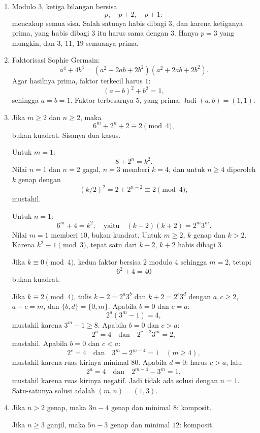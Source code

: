 \documentclass[12pt]{scrartcl}
\begin{document}
\begin{enumerate}[resume]
	\item Modulo $3$, ketiga bilangan bersisa
	\[ p, \quad p + 2, \quad p + 1: \]
	mencakup semua sisa. Salah satunya habis dibagi $3$,
	dan karena ketiganya prima, yang habis dibagi $3$ itu harus sama dengan $3$.
	Hanya $p = 3$ yang mungkin, dan $3$, $11$, $19$ semuanya prima.

	\item Faktorisasi Sophie Germain:
	\[ a^4 + 4b^4 = (a^2 - 2ab + 2b^2)(a^2 + 2ab + 2b^2). \]
	Agar hasilnya prima, faktor terkecil harus $1$:
	\[ (a-b)^2 + b^2 = 1, \]
	sehingga $a = b = 1$.
	Faktor terbesarnya $5$, yang prima. Jadi $(a, b) = (1, 1)$.

	\item Jika $m \ge 2$ dan $n \ge 2$, maka
	\[ 6^m + 2^n + 2 \equiv 2 \pmod{4}, \]
	bukan kuadrat. Sisanya dua kasus.

	Untuk $m = 1$:
	\[ 8 + 2^n = k^2. \]
	Nilai $n = 1$ dan $n = 2$ gagal, $n = 3$ memberi $k = 4$,
	dan untuk $n \ge 4$ diperoleh $k$ genap dengan
	\[ (k/2)^2 = 2 + 2^{n-2} \equiv 2 \pmod{4}, \]
	mustahil.

	Untuk $n = 1$:
	\[ 6^m + 4 = k^2, \quad \text{yaitu} \quad (k-2)(k+2) = 2^m 3^m. \]
	Nilai $m = 1$ memberi $10$, bukan kuadrat.
	Untuk $m \ge 2$, $k$ genap dan $k > 2$.
	Karena $k^2 \equiv 1 \pmod{3}$, tepat satu dari $k-2$, $k+2$ habis dibagi $3$.

	Jika $k \equiv 0 \pmod{4}$, kedua faktor bersisa $2$ modulo $4$
	sehingga $m = 2$, tetapi
	\[ 6^2 + 4 = 40 \]
	bukan kuadrat.

	Jika $k \equiv 2 \pmod{4}$, tulis $k - 2 = 2^a 3^b$ dan $k + 2 = 2^c 3^d$
	dengan $a, c \ge 2$, $a + c = m$, dan $\{b, d\} = \{0, m\}$.
	Apabila $b = 0$ dan $c = a$:
	\[ 2^a(3^m - 1) = 4, \]
	mustahil karena $3^m - 1 \ge 8$.
	Apabila $b = 0$ dan $c > a$:
	\[ 2^a = 4 \quad \text{dan} \quad 2^{c-2} 3^m = 2, \]
	mustahil.
	Apabila $b = 0$ dan $c < a$:
	\[ 2^c = 4 \quad \text{dan} \quad 3^m - 2^{m-4} = 1 \quad (m \ge 4), \]
	mustahil karena ruas kirinya minimal $80$.
	Apabila $d = 0$: harus $c > a$, lalu
	\[ 2^a = 4 \quad \text{dan} \quad 2^{m-4} - 3^m = 1, \]
	mustahil karena ruas kirinya negatif.
	Jadi tidak ada solusi dengan $n = 1$.
	Satu-satunya solusi adalah $(m, n) = (1, 3)$.

	\item Jika $n > 2$ genap, maka $3n - 4$ genap dan minimal $8$: komposit.

	Jika $n \ge 3$ ganjil, maka $5n - 3$ genap dan minimal $12$: komposit.


\end{enumerate}
\end{document}
